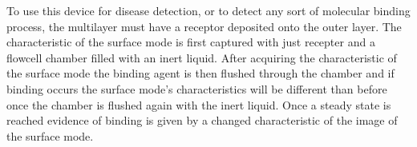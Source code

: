 \begin{flushleft}
	\hspace{0.15in}
	To use this device for disease detection, or to detect any sort of molecular binding process, the multilayer must have a receptor deposited onto the outer layer. The characteristic of the surface mode is first captured with just recepter and a flowcell chamber filled with an inert liquid. After acquiring the characteristic of the surface mode the binding agent is then flushed through the chamber and if binding occurs the surface mode's characteristics will be different than before once the chamber is flushed again with the inert liquid. Once a steady state is reached evidence of binding is given by a changed characteristic of the image of the surface mode.
	\pagestyle{empty}
\end{flushleft}
